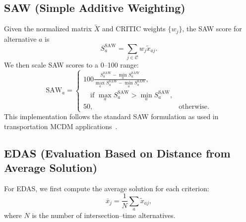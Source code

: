 \documentclass[conference]{IEEEtran}
\begin{document}
\subsection{SAW (Simple Additive Weighting)}

Given the normalized matrix $\tilde X$ and CRITIC weights $\{w_j\}$, the SAW
score for alternative $a$ is
\begin{equation}
S^{\text{SAW}}_a = \sum_{j \in \mathcal{C}} w_j \tilde x_{a j}.
\end{equation}
We then scale SAW scores to a 0--100 range:
\begin{equation}
\mathrm{SAW}_a =
\begin{cases}
100 \displaystyle
\frac{
S^{\text{SAW}}_a - \min_a S^{\text{SAW}}_a
}{
\max_a S^{\text{SAW}}_a - \min_a S^{\text{SAW}}_a
},
& \\
\quad\text{if }\max_a S^{\text{SAW}}_a > \min_a S^{\text{SAW}}_a, \\[0.6em]
50, & \text{otherwise}.
\end{cases}
\end{equation}
This implementation follows the standard SAW formulation as used in transportation
MCDM applications~\cite{Amraji2025CombinedSafetyIndex}.

\subsection{EDAS (Evaluation Based on Distance from Average Solution)}

For EDAS, we first compute the average solution for each criterion:
\begin{equation}
\bar x_j = \frac{1}{N} \sum_a \tilde x_{a j},
\end{equation}
where $N$ is the number of intersection--time alternatives.
\end{document}

